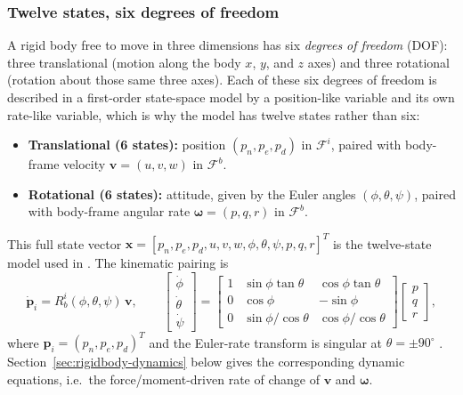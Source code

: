 \documentclass{article}
\begin{document}
\subsubsection{Twelve states, six degrees of freedom}
\label{sec:twelvestates}
A rigid body free to move in three dimensions has six \emph{degrees of freedom} (DOF): three translational (motion along the body $x$, $y$, and $z$ axes) and three rotational (rotation about those same three axes). Each of these six degrees of freedom is described in a first-order state-space model by a position-like variable and its own rate-like variable, which is why the model has twelve states rather than six:
\begin{itemize}
    \item \textbf{Translational (6 states):} position $(p_n,p_e,p_d)$ in $\mathcal{F}^i$, paired with body-frame velocity $\mathbf{v}=(u,v,w)$ in $\mathcal{F}^b$.
    \item \textbf{Rotational (6 states):} attitude, given by the Euler angles $(\phi,\theta,\psi)$, paired with body-frame angular rate $\boldsymbol{\omega}=(p,q,r)$ in $\mathcal{F}^b$.
\end{itemize}
This full state vector $\mathbf{x}=[p_n,p_e,p_d,u,v,w,\phi,\theta,\psi,p,q,r]^{T}$ is the twelve-state model used in \citep{beardmclain2012}. The kinematic pairing is
\begin{equation}
    \dot{\mathbf{p}}_{i}=R^{i}_{b}(\phi,\theta,\psi)\,\mathbf{v},\qquad
    \begin{bmatrix}\dot\phi\\\dot\theta\\\dot\psi\end{bmatrix}
    =\begin{bmatrix}1&\sin\phi\tan\theta&\cos\phi\tan\theta\\0&\cos\phi&-\sin\phi\\0&\sin\phi/\cos\theta&\cos\phi/\cos\theta\end{bmatrix}
    \begin{bmatrix}p\\q\\r\end{bmatrix},
    \label{eq:euler-kinematics}
\end{equation}
where $\mathbf{p}_i=(p_n,p_e,p_d)^T$ and the Euler-rate transform is singular at $\theta=\pm90^{\circ}$ \citep{beardmclain2012}. Section~\ref{sec:rigidbody-dynamics} below gives the corresponding dynamic equations, i.e.\ the force/moment-driven rate of change of $\mathbf{v}$ and $\boldsymbol{\omega}$.
\end{document}
